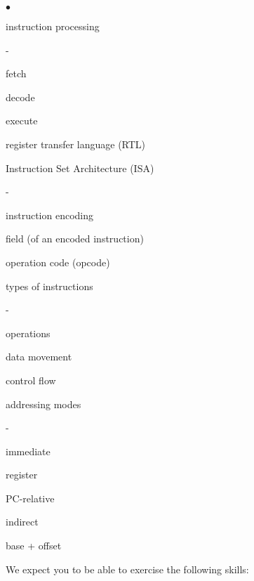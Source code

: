 \begin{minipage}[t]{3.1in}
\begin{list}{$\bullet$}{\setlength{\itemsep}{0pt}\setlength{\parskip}{0pt}%
\setlength{\topsep}{0pt}\setlength{\partopsep}{0pt}\setlength{\parsep}{0pt}}
\item{instruction processing}
\begin{list}{-}{\setlength{\itemsep}{0pt}\setlength{\parskip}{0pt}%
\setlength{\topsep}{0pt}\setlength{\partopsep}{0pt}\setlength{\parsep}{0pt}}
\item{fetch}
\item{decode}
\item{execute}
\item{register transfer language (RTL)}
\end{list}

\item{Instruction Set Architecture (ISA)}
\begin{list}{-}{\setlength{\itemsep}{0pt}\setlength{\parskip}{0pt}%
\setlength{\topsep}{0pt}\setlength{\partopsep}{0pt}\setlength{\parsep}{0pt}}
\item{instruction encoding}
\item{field (of an encoded instruction)}
\item{operation code (opcode)}
\item{types of instructions}
\begin{list}{-}{\setlength{\itemsep}{0pt}\setlength{\parskip}{0pt}%
\setlength{\topsep}{0pt}\setlength{\partopsep}{0pt}\setlength{\parsep}{0pt}}
\item{operations}
\item{data movement}
\item{control flow}
\end{list}
\item{addressing modes}
\begin{list}{-}{\setlength{\itemsep}{0pt}\setlength{\parskip}{0pt}%
\setlength{\topsep}{0pt}\setlength{\partopsep}{0pt}\setlength{\parsep}{0pt}}
\item{immediate}
\item{register}
\item{PC-relative}
\item{indirect}
\item{base + offset}
\end{list}
\end{list}


\end{list}
\end{minipage}

\vfill

\pagebreak

We expect you to be able to exercise the following skills:


